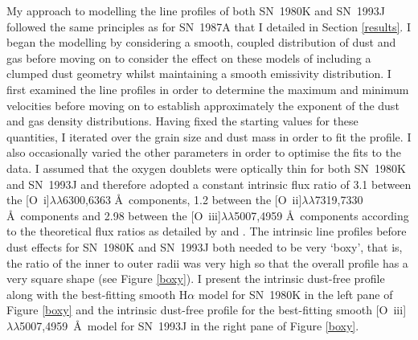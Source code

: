 My approach to modelling the line profiles of both SN~1980K and SN~1993J followed the same principles as for SN~1987A that I detailed in Section \ref{results}.  I began the modelling by considering a smooth, coupled distribution of dust and gas before moving on to consider the effect on these models of including a clumped dust geometry whilst maintaining a smooth emissivity distribution.  I first examined the line profiles in order to determine the maximum and minimum velocities before moving on to establish approximately the exponent of the dust and gas density distributions.  Having fixed the starting values for these quantities, I iterated over the grain size and dust mass in order to fit the profile.  I also occasionally  varied the other parameters in order to optimise the fits to the data. I assumed that the oxygen doublets were optically thin for both SN~1980K and SN~1993J and therefore adopted a constant intrinsic flux ratio of 3.1 between the [O~{\sc i}]$\lambda\lambda$6300,6363 \AA\  components, 1.2 between the [O~{\sc ii}]$\lambda\lambda$7319,7330 \AA\  components and 2.98 between the [O~{\sc iii}]$\lambda\lambda$5007,4959 \AA\  components according to the theoretical flux ratios as detailed by \citet{Zeippen1987} and \citet{Storey2000}.  The intrinsic line profiles before dust effects for SN~1980K and SN~1993J both needed to be very `boxy', that is, the ratio of the inner to outer radii was very high so that the overall profile has a very square shape (see Figure \ref{boxy}).  I present the intrinsic dust-free profile along with the best-fitting smooth H$\alpha$ model for SN~1980K in the left pane of Figure \ref{boxy} and the intrinsic dust-free profile for the best-fitting smooth [O~{\sc iii}]$\lambda\lambda$5007,4959~\AA\ model for SN~1993J in the right pane of Figure \ref{boxy}.

